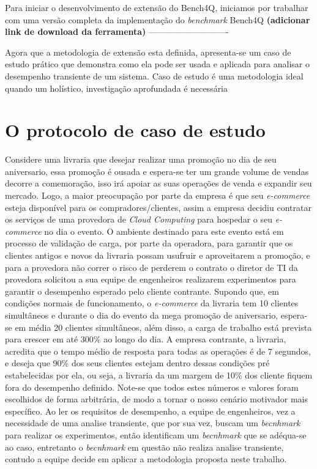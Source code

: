 Para iniciar o desenvolvimento de extensão do Bench4Q, iniciamos por trabalhar com uma versão completa da implementação do \textit{benchmark} Bench4Q \textbf{(adicionar link de download da ferramenta)}
----------------------------

Agora que a metodologia de extensão esta definida, apresenta-se um caso de estudo prático que demonstra como ela pode ser usada e aplicada para analisar o desempenho transiente de um sistema. Caso de estudo é uma metodologia ideal quando um holístico, investigação aprofundada é necessária %

\section{O protocolo de caso de estudo}
Considere uma livraria que desejar realizar uma promoção no dia de seu aniversario, essa promoção é ousada e espera-se ter um grande volume de vendas decorre a comemoração, isso irá apoiar as suas operações de venda e expandir seu mercado. Logo, a maior preocupação por parte da empresa é que seu \textit{e-commerce} esteja disponível para os compradores/clientes, assim a empresa decidiu contratar os serviços de uma provedora de \textit{Cloud Computing} para hospedar o seu \textit{e-commerce} no dia o evento. O ambiente destinado para este evento está em processo de validação de carga, por parte da operadora, para garantir que os clientes antigos e novos da livraria possam usufruir e aproveitarem a promoção, e para a provedora não correr o risco de perderem o contrato o diretor de TI da provedora solicitou a sua equipe de engenheiros realizarem experimentos para garantir o desempenho esperado pelo cliente contrante.
Supondo que, em condições normais de funcionamento, o \textit{e-commerce} da livraria tem 10 clientes simultâneos e durante o dia do evento da mega promoção de aniversario, espera-se em média 20 clientes simultâneos,  além disso, a carga de trabalho está prevista para crescer em até 300\% ao longo do dia. A empresa contrante, a livraria, acredita que o tempo médio de resposta para todas as operações é de 7 segundos, e deseja que 90\% dos seus clientes estejam dentro dessas condições pré estabelecidas por ela, ou seja, a livraria da um margem de 10\% dos cliente fiquem fora do desempenho definido. Note-se que todos estes números e valores foram escolhidos de forma arbitrária, de modo a tornar o nosso cenário motivador mais específico.
Ao ler os requisitos de desempenho, a equipe de engenheiros, vez a necessidade de uma analise transiente, que por sua vez, buscam um \textit{becnhmark} para realizar os experimentos, então identificam um \textit{becnhmark} que se adéqua-se ao caso, entretanto o \textit{becnhmark} em questão não realiza analise transiente, contudo a equipe decide em aplicar a metodologia proposta neste trabalho.

